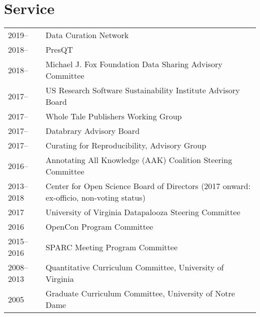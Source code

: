 \documentclass[11pt]{article}
\begin{document}
\section*{Service}
\begin{tabularx}{\textwidth}{lX}
2019--      & Data Curation Network\\
2018--      & PresQT\\
2018--		& Michael J. Fox Foundation Data Sharing Advisory Committee\\
2017--		& US Research Software Sustainability Institute Advisory Board\\
2017--		& Whole Tale Publishers Working Group\\
2017--		& Databrary Advisory Board\\
2017--              	& Curating for Reproducibility, Advisory Group\\
2016--      		& Annotating All Knowledge (AAK) Coalition Steering Committee\\
2013--2018		& Center for Open Science Board of Directors (2017 onward: ex-officio, non-voting status)\\
2017			& University of Virginia Datapalooza Steering Committee\\
2016	      		& OpenCon Program Committee\\
2015--2016  	& SPARC Meeting Program Committee\\
2008--2013  	& Quantitative Curriculum Committee, University of Virginia\\
2005        		& Graduate Curriculum Committee, University of Notre Dame\\
\end{tabularx}
\end{document}
